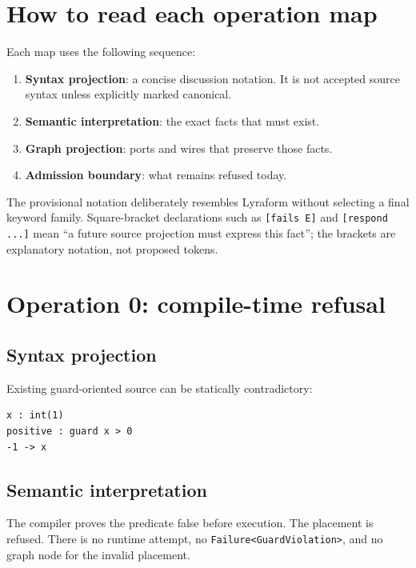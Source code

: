 \documentclass[11pt,a4paper]{article}
\newcommand{\code}[1]{\texttt{#1}}
\begin{document}
\section{How to read each operation map}

Each map uses the following sequence:

\begin{enumerate}[leftmargin=*,nosep]
  \item \textbf{Syntax projection}: a concise discussion notation. It is not
        accepted source syntax unless explicitly marked canonical.
  \item \textbf{Semantic interpretation}: the exact facts that must exist.
  \item \textbf{Graph projection}: ports and wires that preserve those facts.
  \item \textbf{Admission boundary}: what remains refused today.
\end{enumerate}

The provisional notation deliberately resembles Lyraform without selecting a
final keyword family. Square-bracket declarations such as
\code{[fails E]} and \code{[respond ...]} mean ``a future source projection
must express this fact''; the brackets are explanatory notation, not proposed
tokens.

\section{Operation 0: compile-time refusal}

\subsection*{Syntax projection}

Existing guard-oriented source can be statically contradictory:

\begin{lstlisting}[style=lyraform]
x : int(1)
positive : guard x > 0
-1 -> x
\end{lstlisting}

\subsection*{Semantic interpretation}

The compiler proves the predicate false before execution. The placement is
refused. There is no runtime attempt, no \code{Failure<GuardViolation>}, and no
graph node for the invalid placement.
\end{document}
